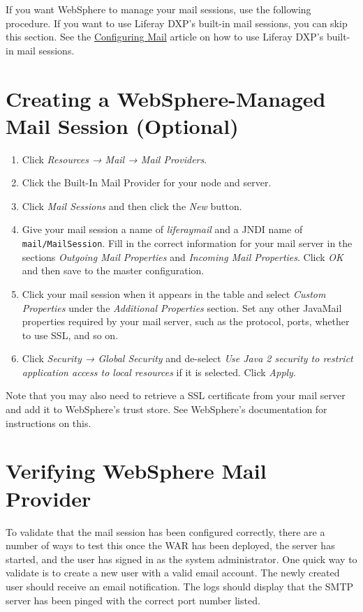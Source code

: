 If you want WebSphere to manage your mail sessions, use the following
procedure. If you want to use Liferay DXP's built-in mail sessions, you
can skip this section. See the
\href{/docs/7-2/deploy/-/knowledge_base/d/configuring-mail}{Configuring
Mail} article on how to use Liferay DXP's built-in mail sessions.

\section{Creating a WebSphere-Managed Mail Session
(Optional)}\label{creating-a-websphere-managed-mail-session-optional}

\begin{enumerate}
\def\labelenumi{\arabic{enumi}.}
\item
  Click \emph{Resources → Mail → Mail Providers}.
\item
  Click the Built-In Mail Provider for your node and server.
\item
  Click \emph{Mail Sessions} and then click the \emph{New} button.
\item
  Give your mail session a name of \emph{liferaymail} and a JNDI name of
  \texttt{mail/MailSession}. Fill in the correct information for your
  mail server in the sections \emph{Outgoing Mail Properties} and
  \emph{Incoming Mail Properties}. Click \emph{OK} and then save to the
  master configuration.
\item
  Click your mail session when it appears in the table and select
  \emph{Custom Properties} under the \emph{Additional Properties}
  section. Set any other JavaMail properties required by your mail
  server, such as the protocol, ports, whether to use SSL, and so on.
\item
  Click \emph{Security → Global Security} and de-select \emph{Use Java 2
  security to restrict application access to local resources} if it is
  selected. Click \emph{Apply}.
\end{enumerate}

Note that you may also need to retrieve a SSL certificate from your mail
server and add it to WebSphere's trust store. See WebSphere's
documentation for instructions on this.

\section{Verifying WebSphere Mail
Provider}\label{verifying-websphere-mail-provider}

To validate that the mail session has been configured correctly, there
are a number of ways to test this once the WAR has been deployed, the
server has started, and the user has signed in as the system
administrator. One quick way to validate is to create a new user with a
valid email account. The newly created user should receive an email
notification. The logs should display that the SMTP server has been
pinged with the correct port number listed.

